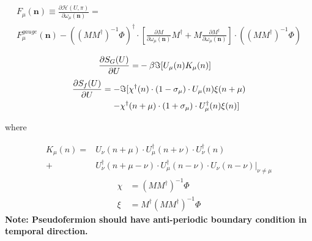 \documentclass[10pt]{beamer}
\begin{document}
\begin{frame}

    \begin{equation}
        \begin{gathered}
        F_\mu(\textbf{n}) \equiv \frac{\partial \mathcal{H}(U,\pi)}{\partial \omega_{\mu}(\textbf{n})}
                 = \\ F^{gauge}_{\mu}(\textbf{n})
                 - \left( \left(M M^\dagger\right)^{-1} \Phi \right)^\dagger \cdot
                 \left[ \frac{\partial M}{\partial \omega_{\mu}(\textbf{n})} M^\dagger + M\frac{\partial M^\dagger}{\partial \omega_{\mu}(\textbf{n})}\right] \cdot
                 \left( \left(M M^\dagger\right)^{-1} \Phi \right)
        \end{gathered}
        \end{equation}
        
    \begin{align}
        \diffp{S_G(U)}{U} =& - \beta \Im[U_\mu(n)K_\mu(n)]
    \end{align}
    \begin{align}
        \diffp{S_f(U)}{U} = -&\Im[\chi^\dagger(n)\cdot(1-\sigma_\mu)\cdot U_\mu(n)\xi(n+\mu) \\ 
                            -&\chi^\dagger(n+\mu)\cdot (1+\sigma_\mu)\cdot U_\mu^\dagger(n)\xi(n)]\end{align}
    
\end{frame}
\begin{frame}
    \begin{center}
        where
    \end{center}
    \begin{align}
        K_{\mu}(n) = &U_{\nu}(n+\mu) \cdot U_{\mu}^\dagger(n+\nu) \cdot U_{\nu}^\dagger(n)  \\
                    +& U_{\nu}^\dagger(n+\mu-\nu) \cdot U_{\mu}^\dagger(n-\nu) \cdot U_{\nu}(n-\nu)\vert_{\nu\neq\mu}
    \end{align}
    \begin{align}
        \chi &= (MM^\dagger)^{-1}\Phi\\
        \xi &= M^\dagger(MM^\dagger)^{-1}\Phi
    \end{align}
    \textbf{Note: Pseudofermion should have anti-periodic boundary condition in temporal direction.}
\end{frame}
\end{document}
